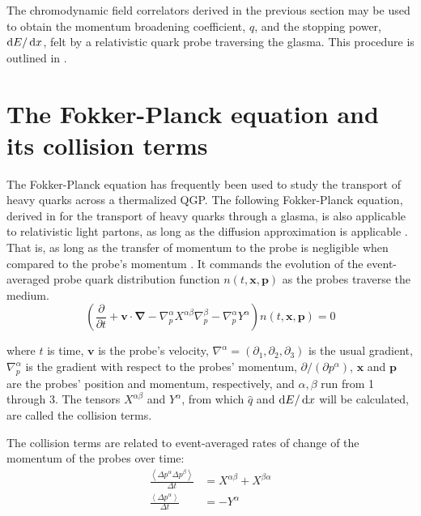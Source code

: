 
The chromodynamic field correlators derived in the previous section may be used to obtain the momentum broadening coefficient, $\hat{q}$, and the stopping power, $\mathop{}\!\mathrm{d} E/\mathop{}\!\mathrm{d} x$,  felt by a relativistic quark probe traversing the glasma. This procedure is outlined in \cite{Carrington_2022}.

\section{The Fokker-Planck equation and its collision terms}
\label{sec:fokker-planck}

The Fokker-Planck equation has frequently been used to study the transport of heavy quarks across a thermalized QGP. The following Fokker-Planck equation, derived in \cite{Mrowczynski2018} for the transport of heavy quarks through a glasma, is also applicable to relativistic light partons, as long as the diffusion approximation is applicable \cite{Carrington_2022}. That is, as long as the transfer of momentum to the probe is negligible when compared to the probe's momentum \citep{Mrowczynski2018}. It commands the evolution of the event-averaged probe quark distribution function $n(t,\mathbf{x},\mathbf{p})$ as the probes traverse the medium.
\begin{equation}
	\left(\frac{\partial}{\partial t} 
	+ \mathbf{v} \cdot \mathbf{\nabla}
	- \nabla^\alpha_p X^{\alpha \beta} \nabla^\beta_p
	- \nabla^\alpha_p Y^\alpha
	\right) n(t, \mathbf{x}, \mathbf{p}) = 0
\end{equation}

where $t$ is time, $\textbf{v}$ is the probe's velocity, $\nabla^\alpha = (\partial_1, \partial_2, \partial_3)$ is the usual gradient, $\nabla_p^\alpha$ is the gradient with respect to the probes' momentum, $\partial/(\partial p^\alpha)$, $\mathbf{x}$ and $\mathbf{p}$ are the probes' position and momentum, respectively, and $\alpha,\beta$ run from 1 through 3. The tensors $X^{\alpha\beta}$ and $Y^\alpha$, from which $\hat{q}$ and $\mathop{}\!\mathrm{d} E / \mathop{}\!\mathrm{d} x$ will be calculated, are called the collision terms. 

The collision terms are related to event-averaged rates of change of the momentum of the probes over time:
\begin{subequations}
\begin{align}
	\frac{\left< \Delta p^\alpha \Delta p^\beta \right>}{\Delta t} &= X^{\alpha\beta} + X^{\beta\alpha} \label{eq:momentum_from_X}\\
	\frac{\left< \Delta p^\alpha \right>}{\Delta t} &= -Y^\alpha
\end{align}
\end{subequations}

